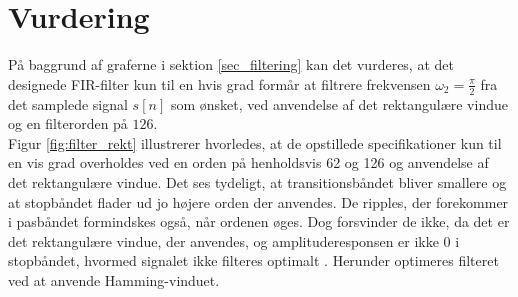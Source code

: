 \section{Vurdering}
På baggrund af graferne i sektion \ref{sec_filtering} kan det vurderes, at det designede FIR-filter kun til en hvis grad formår at filtrere frekvensen $\omega_2=\frac{\pi}{2}$ fra det samplede signal $s[n]$ som ønsket, ved anvendelse af det rektangulære vindue og en filterorden på $126$. \\
Figur \ref{fig:filter_rekt} illustrerer hvorledes, at de opstillede specifikationer kun til en vis grad overholdes ved en orden på henholdsvis 62 og 126 og anvendelse af det rektangulære vindue. Det ses tydeligt, at transitionsbåndet bliver smallere og at stopbåndet flader ud jo højere orden der anvendes. De ripples, der forekommer i pasbåndet formindskes også, når ordenen øges. Dog forsvinder de ikke, da det er det rektangulære vindue, der anvendes, og amplituderesponsen er ikke 0 i stopbåndet,
hvormed signalet ikke filteres optimalt  . Herunder optimeres filteret ved at anvende Hamming-vinduet.

